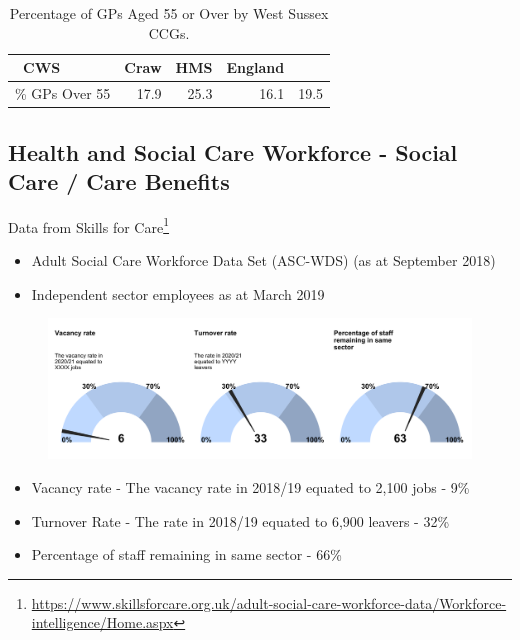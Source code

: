
\begin{table}[hbt]
    \caption{Percentage of GPs Aged 55 or Over by West Sussex CCGs.}
    \centering
    \begin{tabular}{lrrrr}
    \toprule
    \ CWS & Craw & HMS & England \\
    \midrule
    \% GPs Over 55 & 17.9 & 25.3 & 16.1 & 19.5 \\
    \bottomrule
    \end{tabular}
    \label{tab:wa:primarystaff_o55}
\end{table}


\subsection{Health and Social Care Workforce - Social Care / Care Benefits}
Data from Skills for Care\footnote{\url{https://www.skillsforcare.org.uk/adult-social-care-workforce-data/Workforce-intelligence/Home.aspx}}
\begin{itemize}[noitemsep]
    \item Adult Social Care Workforce Data Set (ASC-WDS) (as at September 2018)
    \item Independent sector employees as at March 2019
\end{itemize}

\begin{figure}[h]
    \centering
    \includegraphics[width=\linewidth]{images/workforce_dial_chart.png}
\end{figure}

\begin{itemize}[noitemsep]
    \item Vacancy rate - The vacancy rate in 2018/19 equated to 2,100 jobs - 9\%
    \item Turnover Rate - The rate in 2018/19 equated to 6,900 leavers - 32\%
    \item Percentage of staff remaining in same sector - 66\%
\end{itemize} 

